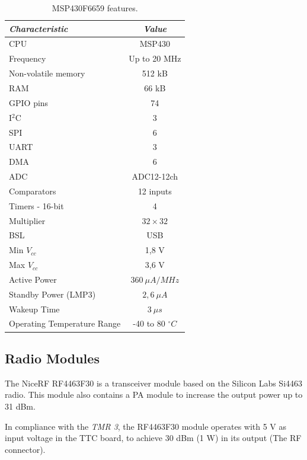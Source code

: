 \documentclass[12pt]{book}
\begin{document}
\begin{table}[!h]
	\begin{center}
		\begin{tabular}{lc}
			\toprule[1.5pt]
			\textit{Characteristic} & \textit{Value} \\
			\midrule
			CPU & MSP430 \\
			Frequency & Up to 20 MHz \\
			Non-volatile memory & 512 kB \\
			RAM & 66 kB \\
			GPIO pins & 74 \\
			I$^{2}$C & 3 \\
			SPI & 6 \\
			UART & 3 \\
			DMA & 6 \\
			ADC & ADC12-12ch \\
			Comparators & 12 inputs \\
			Timers - 16-bit & 4 \\
			Multiplier & $32 \times 32$ \\
			BSL & USB \\
			Min $V_{cc}$ & 1,8 V \\
			Max $V_{cc}$ & 3,6 V \\
			Active Power & $360\ \mu A/MHz$ \\
			Standby Power (LMP3) & $2,6\ \mu A$ \\
			Wakeup Time & $3\ \mu s$ \\
			Operating Temperature Range & -40 to 80 $^{\circ}C$ \\
			\bottomrule[1.5pt]
		\end{tabular}
		\caption{MSP430F6659 features.}
		\label{tab:msp430f6659-info}
	\end{center}
\end{table}

\subsection{Radio Modules}

The NiceRF RF4463F30 \cite{rf4463f30} is a transceiver module based on the Silicon Labs Si4463 \cite{si4463} radio. This module also contains a PA module to increase the output power up to 31 dBm.

In compliance with the \textit{TMR 3}, the RF4463F30 module operates with 5 V as input voltage in the TTC board, to achieve 30 dBm (1 W) in its output (The RF connector).
\end{document}

